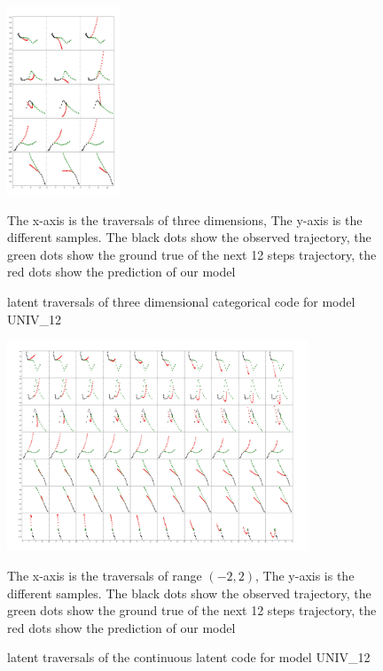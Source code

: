 \begin{figure}[b]
  \centering
  \includegraphics[width=0.3\textwidth]{figures/disc_interpolations_code0_batch2.jpeg}
  \caption{latent traversals of three dimensional categorical code for model UNIV\_12}{The x-axis is the traversals of three dimensions, The y-axis is the different samples. The black dots show the observed trajectory, the green dots show the ground true of the next 12 steps trajectory, the red dots show the prediction of our model}
  \label{disc_code}
\end{figure}

\begin{figure}[ht]
  \centering
  \includegraphics[width=0.8\textwidth]{figures/cont_interpolations_code0_batch2.jpeg}
  \caption{latent traversals of the continuous latent code for model UNIV\_12}{The x-axis is the traversals of range $(-2, 2)$, The y-axis is the different samples. The black dots show the observed trajectory, the green dots show the ground true of the next 12 steps trajectory, the red dots show the prediction of our model}
  \label{cont_code}
\end{figure}

